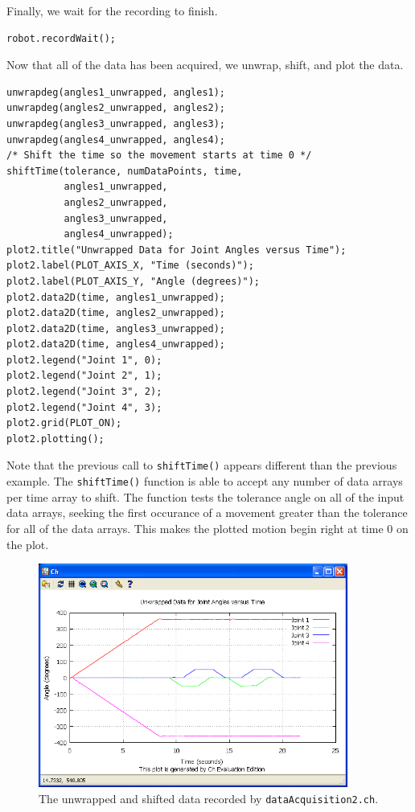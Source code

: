 \documentclass{article}
\begin{document}
Finally, we wait for the recording to finish.
\begin{verbatim}
robot.recordWait();
\end{verbatim}

Now that all of the data has been acquired, we unwrap, shift, and plot the data.
\begin{verbatim}
unwrapdeg(angles1_unwrapped, angles1);
unwrapdeg(angles2_unwrapped, angles2);
unwrapdeg(angles3_unwrapped, angles3);
unwrapdeg(angles4_unwrapped, angles4);
/* Shift the time so the movement starts at time 0 */
shiftTime(tolerance, numDataPoints, time, 
          angles1_unwrapped, 
          angles2_unwrapped, 
          angles3_unwrapped, 
          angles4_unwrapped);
plot2.title("Unwrapped Data for Joint Angles versus Time");
plot2.label(PLOT_AXIS_X, "Time (seconds)");
plot2.label(PLOT_AXIS_Y, "Angle (degrees)");
plot2.data2D(time, angles1_unwrapped);
plot2.data2D(time, angles2_unwrapped);
plot2.data2D(time, angles3_unwrapped);
plot2.data2D(time, angles4_unwrapped);
plot2.legend("Joint 1", 0);
plot2.legend("Joint 2", 1);
plot2.legend("Joint 3", 2);
plot2.legend("Joint 4", 3);
plot2.grid(PLOT_ON);
plot2.plotting();
\end{verbatim}
Note that the previous call to \texttt{shiftTime()} appears different than the previous
example. The \texttt{shiftTime()} function is able to accept any number of data
arrays per time array to shift. The function tests the tolerance angle on all of the
input data arrays, seeking the first occurance of a movement greater than the tolerance
for all of the data arrays. This makes the plotted motion begin right at time 0 on
the plot.

\begin{figure}[H]
\centering
\includegraphics[width=4in]{images/dataacq2_plot1.png}
\caption{\label{fig:dataacq2_fig1} The unwrapped and shifted data recorded by \texttt{dataAcquisition2.ch}.}
\end{figure}
\end{document}
